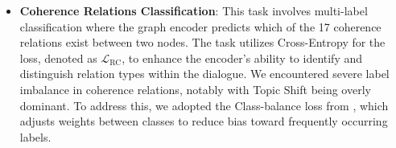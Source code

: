 \documentclass[letterpaper]{article} %
\begin{document}
\begin{itemize}
    \item \textbf{Coherence Relations Classification}: This task involves multi-label classification where the graph encoder predicts which of the 17 coherence relations exist between two nodes. The task utilizes Cross-Entropy for the loss, denoted as \( \mathcal{L}_{\text{RC}} \), to enhance the encoder’s ability to identify and distinguish relation types within the dialogue. We encountered severe label imbalance in coherence relations, notably with Topic Shift being overly dominant. To address this, we adopted the Class-balance loss from \cite{cui-etal-2019-cbloss}, which adjusts weights between classes to reduce bias toward frequently occurring labels.


\end{itemize}
\end{document}
